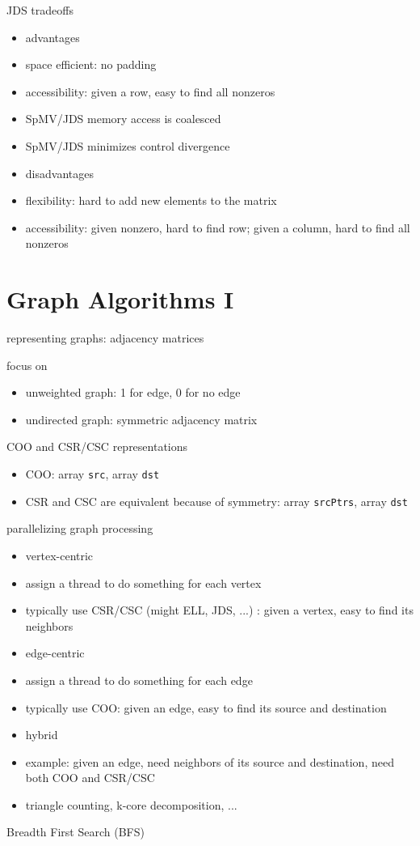 \documentclass{article}
\begin{document}
JDS tradeoffs

\begin{itemize}
\item advantages
\item space efficient: no padding
\item accessibility: given a row, easy to find all nonzeros
\item SpMV/JDS memory access is coalesced
\item SpMV/JDS minimizes control divergence
\item disadvantages
\item flexibility: hard to add new elements to the matrix
\item accessibility: given nonzero, hard to find row; given a column, hard to find all nonzeros
\end{itemize}

\newpage
\section{Graph Algorithms I}

representing graphs: adjacency matrices


focus on

\begin{itemize}
\item unweighted graph: 1 for edge, 0 for no edge
\item undirected graph: symmetric adjacency matrix

\end{itemize}
COO and CSR/CSC representations

\begin{itemize}
\item COO: array \texttt{src}, array \texttt{dst}
\item CSR and CSC are equivalent because of symmetry: array \texttt{srcPtrs}, array \texttt{dst}

\end{itemize}
parallelizing graph processing

\begin{itemize}
\item vertex-centric
\item assign a thread to do something for each vertex
\item typically use CSR/CSC (might ELL, JDS, ...) : given a vertex, easy to find its neighbors
\item edge-centric
\item assign a thread to do something for each edge
\item typically use COO: given an edge, easy to find its source and destination
\item hybrid
\item example: given an edge, need neighbors of its source and destination, need both COO and CSR/CSC
\item triangle counting, k-core decomposition, ...

\end{itemize}
Breadth First Search (BFS) 
\end{document}
